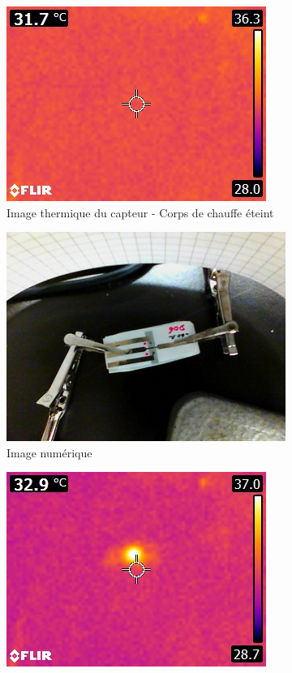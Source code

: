 \begin{figure}[H]
    \hspace{-0.3 cm}
    \begin{subfigure}{0.3\textwidth}
        \includegraphics[scale = 0.45]{assets/figures/thermique_sans_chauffe.jpg}
        \caption{Image thermique du capteur - Corps de chauffe éteint}
    \end{subfigure}
    \hspace{0.2cm}
    \begin{subfigure}{0.3\textwidth}
        \centering
        \includegraphics[scale = 0.23]{assets/figures/visuel_avec_chauffe.jpg}
        \caption{Image numérique}
    \end{subfigure}
    \hspace{0.5cm}
    \begin{subfigure}{0.3\textwidth}
        \includegraphics[scale = 0.5]{assets/figures/thermique_avec_chauffe.jpg}

\end{subfigure}
\end{figure}
